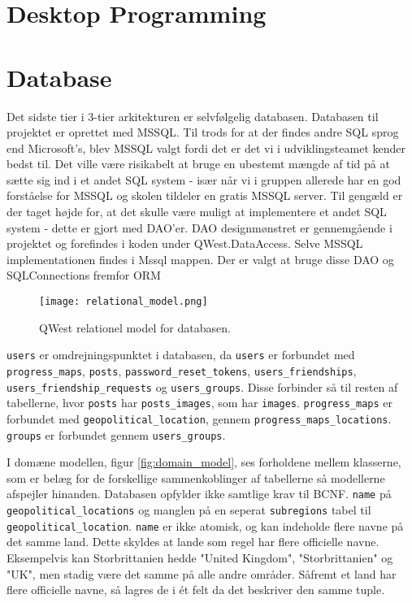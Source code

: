 \section{Desktop Programming}\label{sec:deskProgramming}

\section{Database}\label{sec:database}
Det sidste tier i 3-tier arkitekturen er selvfølgelig databasen. Databasen til projektet er oprettet med MSSQL\cite{MSSQL}. Til trods for at der findes andre SQL sprog end Microsoft's, blev MSSQL valgt fordi det er det vi i udviklingsteamet kender bedst til. Det ville være risikabelt at bruge en ubestemt mængde af tid på at sætte sig ind i et andet SQL system - især når vi i gruppen allerede har en god forståelse for MSSQL og skolen tildeler en gratis MSSQL server. Til gengæld er der taget højde for, at det skulle være muligt at implementere et andet SQL system - dette er gjort med DAO'er. DAO\cite{dao} designmønstret er gennemgående i projektet og forefindes i koden under QWest.DataAccess. Selve MSSQL implementationen findes i Mssql mappen. Der er valgt at bruge disse DAO og SQLConnections fremfor ORM %

\begin{figure}
    \texttt{[image: relational\_model.png]}
    \caption{QWest relationel model for databasen.}
    \label{fig:relational_model}
\end{figure}

\texttt{users} er omdrejningspunktet i databasen, da \texttt{users} er forbundet med \texttt{progress\_maps}, \texttt{posts}, \texttt{password\_reset\_tokens}, \texttt{users\_friendships}, \texttt{users\_friendship\_requests} og \texttt{users\_groups}. Disse forbinder så til resten af tabellerne, hvor \texttt{posts} har \texttt{posts\_images}, som har \texttt{images}. \texttt{progress\_maps} er forbundet med \texttt{geopolitical\_location}, gennem \texttt{progress\_maps\_locations}. \texttt{groups} er forbundet gennem \texttt{users\_groups}.

I domæne modellen, figur \ref{fig:domain_model}, ses forholdene mellem klasserne, som er belæg for de forskellige sammenkoblinger af tabellerne så modellerne afspejler hinanden. Databasen opfylder ikke samtlige krav til BCNF\cite{bcnf}. \texttt{name} på \texttt{geopolitical\_locations} og manglen på en seperat \texttt{subregions} tabel til \texttt{geopolitical\_location}. \texttt{name} er ikke atomisk, og kan indeholde flere navne på det samme land. Dette skyldes at lande som regel har flere officielle navne. Eksempelvis kan Storbrittanien hedde "United Kingdom", "Storbrittanien" og "UK", men stadig være det samme på alle andre områder. Såfremt et land har flere officielle navne, så lagres de i ét felt da det beskriver den samme tuple.

